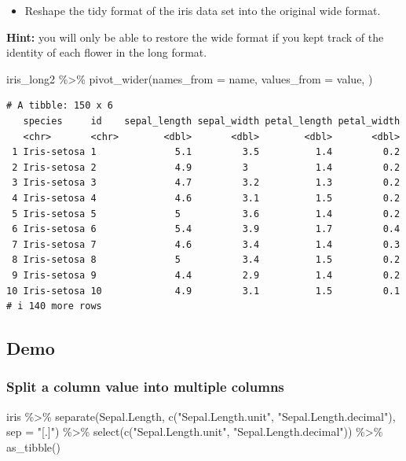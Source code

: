 \documentclass[
  letterpaper,
  DIV=11,
  numbers=noendperiod]{scrartcl}
\newenvironment{Shaded}{\begin{snugshade}}{\end{snugshade}}
\newcommand{\AttributeTok}[1]{\textcolor[rgb]{0.40,0.45,0.13}{#1}}
\newcommand{\FunctionTok}[1]{\textcolor[rgb]{0.28,0.35,0.67}{#1}}
\newcommand{\NormalTok}[1]{\textcolor[rgb]{0.00,0.23,0.31}{#1}}
\newcommand{\SpecialCharTok}[1]{\textcolor[rgb]{0.37,0.37,0.37}{#1}}
\newcommand{\StringTok}[1]{\textcolor[rgb]{0.13,0.47,0.30}{#1}}
\providecommand{\tightlist}{%
  \setlength{\itemsep}{0pt}\setlength{\parskip}{0pt}}\usepackage{longtable,booktabs,array}
\begin{document}
\begin{itemize}
\tightlist
\item
  Reshape the tidy format of the iris data set into the original wide
  format.
\end{itemize}

\textbf{Hint:} you will only be able to restore the wide format if you
kept track of the identity of each flower in the long format.

\begin{Shaded}
\begin{Highlighting}[]
\NormalTok{iris\_long2 }\SpecialCharTok{\%\textgreater{}\%} 
 \FunctionTok{pivot\_wider}\NormalTok{(}\AttributeTok{names\_from =}\NormalTok{ name, }\AttributeTok{values\_from =}\NormalTok{ value, )}
\end{Highlighting}
\end{Shaded}

\begin{verbatim}
# A tibble: 150 x 6
   species     id    sepal_length sepal_width petal_length petal_width
   <chr>       <chr>        <dbl>       <dbl>        <dbl>       <dbl>
 1 Iris-setosa 1              5.1         3.5          1.4         0.2
 2 Iris-setosa 2              4.9         3            1.4         0.2
 3 Iris-setosa 3              4.7         3.2          1.3         0.2
 4 Iris-setosa 4              4.6         3.1          1.5         0.2
 5 Iris-setosa 5              5           3.6          1.4         0.2
 6 Iris-setosa 6              5.4         3.9          1.7         0.4
 7 Iris-setosa 7              4.6         3.4          1.4         0.3
 8 Iris-setosa 8              5           3.4          1.5         0.2
 9 Iris-setosa 9              4.4         2.9          1.4         0.2
10 Iris-setosa 10             4.9         3.1          1.5         0.1
# i 140 more rows
\end{verbatim}

\subsection{Demo}\label{demo-11}

\subsubsection{Split a column value into multiple
columns}\label{split-a-column-value-into-multiple-columns}

\begin{Shaded}
\begin{Highlighting}[]
\NormalTok{iris }\SpecialCharTok{\%\textgreater{}\%} 
    \FunctionTok{separate}\NormalTok{(Sepal.Length, }\FunctionTok{c}\NormalTok{(}\StringTok{"Sepal.Length.unit"}\NormalTok{, }\StringTok{"Sepal.Length.decimal"}\NormalTok{), }\AttributeTok{sep =} \StringTok{"[.]"}\NormalTok{) }\SpecialCharTok{\%\textgreater{}\%}
    \FunctionTok{select}\NormalTok{(}\FunctionTok{c}\NormalTok{(}\StringTok{"Sepal.Length.unit"}\NormalTok{, }\StringTok{"Sepal.Length.decimal"}\NormalTok{)) }\SpecialCharTok{\%\textgreater{}\%}
    \FunctionTok{as\_tibble}\NormalTok{()}
\end{Highlighting}
\end{Shaded}
\end{document}
